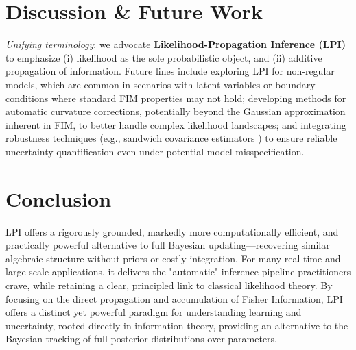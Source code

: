 \documentclass[11pt]{article}
\begin{document}
\section{Discussion \& Future Work}
\textit{Unifying terminology}: we advocate \textbf{Likelihood-Propagation Inference (LPI)} to emphasize (i) likelihood as the sole probabilistic object, and (ii) additive propagation of information.
Future lines include exploring LPI for non-regular models, which are common in scenarios with latent variables or boundary conditions where standard FIM properties may not hold; developing methods for automatic curvature corrections, potentially beyond the Gaussian approximation inherent in FIM, to better handle complex likelihood landscapes; and integrating robustness techniques (e.g., sandwich covariance estimators \cite{white1980heteroskedasticity, huber1967behavior}) to ensure reliable uncertainty quantification even under potential model misspecification.

\section{Conclusion}
LPI offers a rigorously grounded, markedly more computationally efficient, and practically powerful alternative to full Bayesian updating---recovering similar algebraic structure without priors or costly integration. For many real-time and large-scale applications, it delivers the "automatic" inference pipeline practitioners crave, while retaining a clear, principled link to classical likelihood theory. 
By focusing on the direct propagation and accumulation of Fisher Information, LPI offers a distinct yet powerful paradigm for understanding learning and uncertainty, rooted directly in information theory, providing an alternative to the Bayesian tracking of full posterior distributions over parameters.


\end{document}
